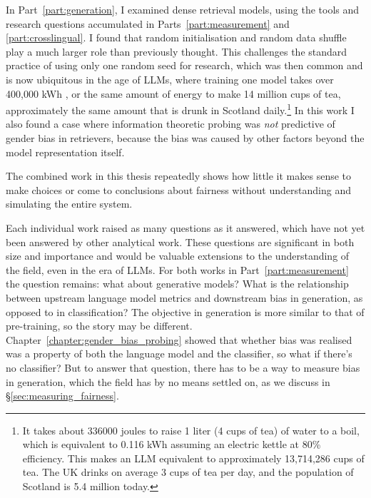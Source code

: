 In Part~\ref{part:generation}, I examined dense retrieval models, using the tools and research questions accumulated in Parts~\ref{part:measurement} and \ref{part:crosslingual}. I found that random initialisation and random data shuffle play a much larger role than previously thought. This challenges the standard practice of using only one random seed for research, which was then common and is now ubiquitous in the age of LLMs, where training one model takes over 400,000 kWh \citep{luccioni_bloom_carbon}, or the same amount of energy to make 14 million cups of tea, approximately the same amount that is drunk in Scotland daily.\footnote{It takes about 336000 joules to raise 1 liter (4 cups of tea) of water to a boil, which is equivalent to 0.116 kWh assuming an electric kettle at 80\% efficiency. This makes an LLM equivalent to approximately 13,714,286 cups of tea. The UK drinks on average 3 cups of tea per day, and the population of Scotland is 5.4 million today.} In this work I also found a case where information theoretic probing was \textit{not} predictive of gender bias in retrievers, because the bias was caused by other factors beyond the model representation itself. 

The combined work in this thesis repeatedly shows how little it makes sense to make choices or come to conclusions about fairness without understanding and simulating the entire system. 

Each individual work raised as many questions as it answered, which have not yet been answered by other analytical work. These questions are significant in both size and importance and would be valuable extensions to the understanding of the field, even in the era of LLMs. For both works in Part~\ref{part:measurement} the question remains: what about generative models?  What is the relationship between upstream language model metrics and downstream bias in generation, as opposed to in classification? The objective in generation is more similar to that of pre-training, so the story may be different. Chapter~\ref{chapter:gender_bias_probing} showed that whether bias was realised was a property of both the language model and the classifier, so what if there's no classifier? 
But to answer that question, there has to be a way to measure bias in generation, which the field has by no means settled on, as we discuss in \S\ref{sec:measuring_fairness}. 

